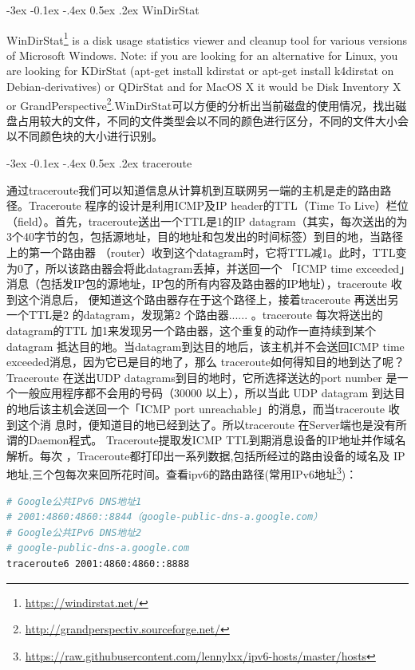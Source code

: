 \documentclass[8pt]{book}
\makeatletter
\numberwithin{dummy}{section}
\theoremstyle{ocrenumbox}
\theoremstyle{blacknumex}
\theoremstyle{blacknumbox}
\theoremstyle{ocrenum}
\renewcommand{\subsection}{\@startsection {subsection}{2}{\z@}
	{-3ex \@plus -0.1ex \@minus -.4ex}
	{0.5ex \@plus.2ex }
	{\normalfont\sffamily\bfseries}}
\makeatother
\begin{document}
\subsection{WinDirStat}

WinDirStat\footnote{\url{https://windirstat.net/}} is a disk usage statistics viewer and cleanup tool for various versions of Microsoft Windows.
Note: if you are looking for an alternative for Linux, you are looking for KDirStat (apt-get install kdirstat or apt-get install k4dirstat on Debian-derivatives) or QDirStat and for MacOS X it would be Disk Inventory X or GrandPerspective\footnote{\url{http://grandperspectiv.sourceforge.net/}}.WinDirStat可以方便的分析出当前磁盘的使用情况，找出磁盘占用较大的文件，不同的文件类型会以不同的颜色进行区分，不同的文件大小会以不同颜色块的大小进行识别。

\subsection{traceroute}

通过traceroute我们可以知道信息从计算机到互联网另一端的主机是走的路由路径。Traceroute 程序的设计是利用ICMP及IP header的TTL（Time To Live）栏位（field）。首先，traceroute送出一个TTL是1的IP datagram（其实，每次送出的为3个40字节的包，包括源地址，目的地址和包发出的时间标签）到目的地，当路径上的第一个路由器 （router）收到这个datagram时，它将TTL减1。此时，TTL变为0了，所以该路由器会将此datagram丢掉，并送回一个 「ICMP time exceeded」消息（包括发IP包的源地址，IP包的所有内容及路由器的IP地址），traceroute 收到这个消息后， 便知道这个路由器存在于这个路径上，接着traceroute 再送出另一个TTL是2 的datagram，发现第2 个路由器...... 。traceroute 每次将送出的datagram的TTL 加1来发现另一个路由器，这个重复的动作一直持续到某个datagram 抵达目的地。当datagram到达目的地后，该主机并不会送回ICMP time exceeded消息，因为它已是目的地了，那么 traceroute如何得知目的地到达了呢？Traceroute 在送出UDP datagrams到目的地时，它所选择送达的port number 是一个一般应用程序都不会用的号码（30000 以上），所以当此 UDP datagram 到达目的地后该主机会送回一个「ICMP port unreachable」的消息，而当traceroute 收到这个消 息时，便知道目的地已经到达了。所以traceroute 在Server端也是没有所谓的Daemon程式。
Traceroute提取发ICMP TTL到期消息设备的IP地址并作域名解析。每次 ，Traceroute都打印出一系列数据,包括所经过的路由设备的域名及 IP地址,三个包每次来回所花时间。查看ipv6的路由路径(常用IPv6地址\footnote{\url{https://raw.githubusercontent.com/lennylxx/ipv6-hosts/master/hosts}})：


\begin{lstlisting}[language=Bash]
# Google公共IPv6 DNS地址1
# 2001:4860:4860::8844（google-public-dns-a.google.com）
# Google公共IPv6 DNS地址2
# google-public-dns-a.google.com
traceroute6 2001:4860:4860::8888
\end{lstlisting}
     
\end{document}
